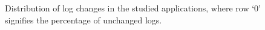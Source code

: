 \begin{figure}[tb]
	
	\centering
	

	
	\caption{Distribution of log changes in the studied applications, where row `0' signifies the percentage of unchanged logs.} 
	\label{fig:frequencyofLogchanges}
\end{figure}








